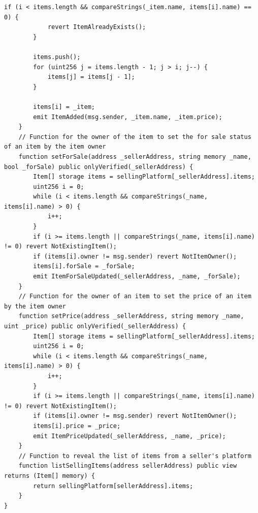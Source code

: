 \documentclass[runningheads]{llncs}
\begin{document}
\begin{lstlisting}[numbers=none]
        if (i < items.length && compareStrings(_item.name, items[i].name) == 0) {
            revert ItemAlreadyExists();
        }

        items.push();
        for (uint256 j = items.length - 1; j > i; j--) {
            items[j] = items[j - 1];
        }

        items[i] = _item;
        emit ItemAdded(msg.sender, _item.name, _item.price);
    }
    // Function for the owner of the item to set the for sale status of an item by the item owner
    function setForSale(address _sellerAddress, string memory _name, bool _forSale) public onlyVerified(_sellerAddress) {
        Item[] storage items = sellingPlatform[_sellerAddress].items;
        uint256 i = 0;
        while (i < items.length && compareStrings(_name, items[i].name) > 0) {
            i++;
        }
        if (i >= items.length || compareStrings(_name, items[i].name) != 0) revert NotExistingItem();
        if (items[i].owner != msg.sender) revert NotItemOwner();
        items[i].forSale = _forSale;
        emit ItemForSaleUpdated(_sellerAddress, _name, _forSale);
    }
    // Function for the owner of an item to set the price of an item by the item owner
    function setPrice(address _sellerAddress, string memory _name, uint _price) public onlyVerified(_sellerAddress) {
        Item[] storage items = sellingPlatform[_sellerAddress].items;
        uint256 i = 0;
        while (i < items.length && compareStrings(_name, items[i].name) > 0) {
            i++;
        }
        if (i >= items.length || compareStrings(_name, items[i].name) != 0) revert NotExistingItem();
        if (items[i].owner != msg.sender) revert NotItemOwner();
        items[i].price = _price;
        emit ItemPriceUpdated(_sellerAddress, _name, _price);
    }
    // Function to reveal the list of items from a seller's platform
    function listSellingItems(address sellerAddress) public view returns (Item[] memory) {
        return sellingPlatform[sellerAddress].items;
    }
}

\end{lstlisting}
%



\newpage


\end{document}
